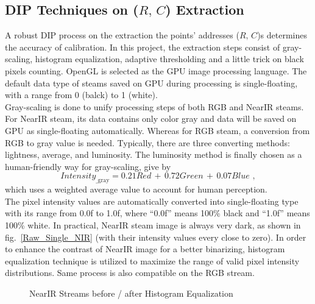 \subsection{DIP Techniques on (\(R,\, C\)) Extraction}
\label{sectionDIPTechniques}
\indent
A robust DIP process on the extraction the points' addresses (\(R,\, C\))s determines the accuracy of calibration. In this project, the extraction steps consist of gray-scaling, histogram equalization, adaptive thresholding and a little trick on black pixels counting. OpenGL is selected as the GPU image processing language. The default data type of steams saved on GPU during processing is single-floating, with a range from 0 (balck) to 1 (white). 
\\\indent
Gray-scaling is done to unify processing steps of both RGB and NearIR steams. For NearIR steam, its data contains only color gray and data will be saved on GPU as single-floating automatically. Whereas for RGB steam, a conversion from RGB to gray value is needed. Typically, there are three converting methods: lightness, average, and luminosity. The luminosity method is finally chosen as a human-friendly way for gray-scaling, give by
%
\begin{equation}
Intensity_{\text{\_gray}} =  0.21 Red\,  + \, 0.72 Green \, + \, 0.07 Blue  \, \, ,
\label{luminosityGrayScaling}
\end{equation}%
which uses a weighted average value to account for human perception.
\\\indent%
The pixel intensity values are automatically converted into single-floating type with its range from 0.0f to 1.0f, where \enquote{0.0f} means 100\% black and \enquote{1.0f}  means 100\% white. In practical, NearIR steam image is always very dark, as shown in fig.~\ref{Raw_Single_NIR} (with their intensity values every close to zero).  In order to enhance the contrast of NearIR image for a better binarizing, histogram equalization technique is utilized to maximize the range of valid pixel intensity distributions. Same process is also compatible on the RGB stream.
%
 \begin{figure}[t]
\hspace*{-0.5cm}
\centering
{}
\caption{NearIR Streams before / after Histogram Equalization}
\label{Histogram_Equalization}
\end{figure}%
